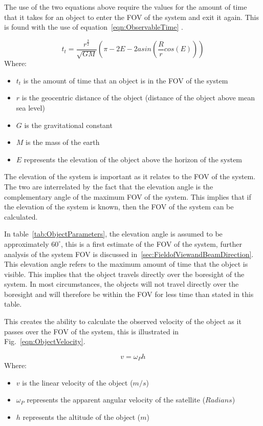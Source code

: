 \documentclass[11pt]{witseiepaper}
\begin{document}
\begin{bibunit}[witseie]
The use of the two equations above require the values for the amount of time that it takes for an object to enter the FOV of the system and exit it again. This is found with the use of equation~\ref{eqn:ObservableTime} \cite{ObservableTime}.

\begin{equation} \label{eqn:ObservableTime}
    t_{t} = \frac{r^{\frac{3}{2}}}{\sqrt{GM}} (\pi - 2E - 2 asin(\frac{R}{r} cos(E)))
\end{equation}
Where:
\begin{itemize}
    \item $t_{t}$ is the amount of time that an object is in the FOV of the system
    \item $r$ is the geocentric distance of the object (distance of the object above mean sea level)
    \item $G$ is the gravitational constant
    \item $M$ is the mass of the earth
    \item $E$ represents the elevation of the object above the horizon of the system
\end{itemize}

The elevation of the system is important as it relates to the FOV of the system. The two are interrelated by the fact that the elevation angle is the complementary angle of the maximum FOV of the system. This implies that if the elevation of the system is known, then the FOV of the system can be calculated.

In table~\ref{tab:ObjectParameters}, the elevation angle is assumed to be approximately $60^{\circ}$, this is a first estimate of the FOV of the system, further analysis of the system FOV is discussed in~\ref{sec:FieldofViewandBeamDirection}. This elevation angle refers to the maximum amount of time that the object is visible. This implies that the object travels directly over the boresight of the system. In most circumstances, the objects will not travel directly over the boresight and will therefore be within the FOV for less time than stated in this table.

This creates the ability to calculate the observed velocity of the object as it passes over the FOV of the system, this is illustrated in Fig.~\ref{eqn:ObjectVelocity}.

\begin{equation} \label{eqn:ObjectVelocity}
    v = \omega_{P} h
\end{equation}
Where:
\begin{itemize}
    \item $v$ is the linear velocity of the object ($m/s$)
    \item $\omega_{P}$ represents the apparent angular velocity of the satellite ($Radians$)
    \item $h$ represents the altitude of the object ($m$)
\end{itemize}



\end{bibunit}
\end{document}
